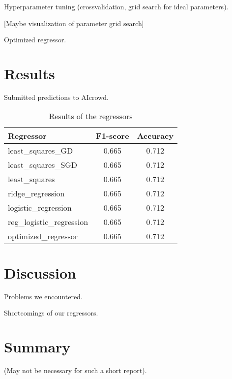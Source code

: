 \documentclass[11pt, a4paper, twocolumn]{article}
\begin{document}
Hyperparameter tuning (crossvalidation, grid search for ideal parameters).

[Maybe visualization of parameter grid search]

Optimized regressor.

\section{Results}
\label{sec:results}

Submitted predictions to AIcrowd.

\begin{table}[h]
    \caption{Results of the regressors}
    \label{tab:results}
    \centering
    \renewcommand{\arraystretch}{1.2}
    \begin{tabular}{@{}lcc@{}}
        \toprule
        Regressor & F1-score & Accuracy \\
        \midrule
        least\_squares\_GD & 0.665 & 0.712 \\
        least\_squares\_SGD & 0.665 & 0.712 \\
        least\_squares & 0.665 & 0.712 \\
        ridge\_regression & 0.665 & 0.712 \\
        logistic\_regression & 0.665 & 0.712 \\
        reg\_logistic\_regression & 0.665 & 0.712 \\
        optimized\_regressor & 0.665 & 0.712 \\
        \bottomrule
    \end{tabular}
\end{table}

\section{Discussion}
\label{sec:discussion}

Problems we encountered.

Shortcomings of our regressors.

\section{Summary}
\label{sec:summary}

(May not be necessary for such a short report).


\end{document}
